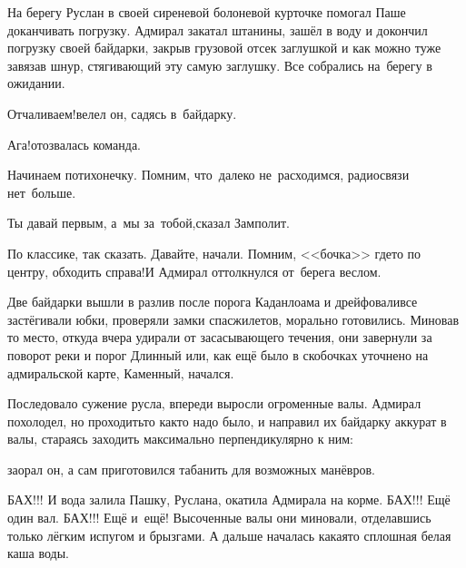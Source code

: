 На берегу Руслан в своей сиреневой болоневой курточке помогал Паше доканчивать погрузку. Адмирал закатал штанины, зашёл в воду и докончил погрузку своей байдарки, закрыв грузовой отсек заглушкой и как можно туже завязав шнур, стягивающий эту самую заглушку. Все собрались на~берегу в ожидании.%

\diagdash Отчаливаем!\mdash велел он, садясь в~байдарку.

\diagdash Ага!\mdash отозвалась команда.

\diagdash Начинаем потихонечку. Помним, что~далеко не~расходимся, радиосвязи нет~больше.

\diagdash Ты давай первым, а~мы за~тобой,\mdash сказал Замполит.

\diagdash По классике, так сказать. Давайте, начали. Помним, <<бочка>> где\sdash то по центру, обходить справа!\mdash И Адмирал оттолкнулся от~берега веслом.

Две байдарки вышли в разлив после порога Каданлоама и дрейфовали\mdash все застёгивали юбки, проверяли замки спасжилетов, морально готовились. Миновав то место, откуда вчера удирали от засасывающего течения, они завернули за поворот реки и порог Длинный или, как ещё было в скобочках уточнено на адмиральской карте, Каменный, начался.

Последовало сужение русла, впереди выросли огроменные валы. Адмирал похолодел, но проходить\sdash то как\sdash то надо было, и направил их байдарку аккурат в валы, стараясь заходить максимально перпендикулярно к ним:

\mdash заорал он, а сам приготовился табанить для возможных манёвров.

БАХ!!! И вода залила Пашку, Руслана, окатила Адмирала на корме. БАХ!!! Ещё один вал. БАХ!!! Ещё и~ещё! Высоченные валы они миновали, отделавшись только лёгким испугом и брызгами. А дальше началась какая\sdash то сплошная белая каша воды. 

